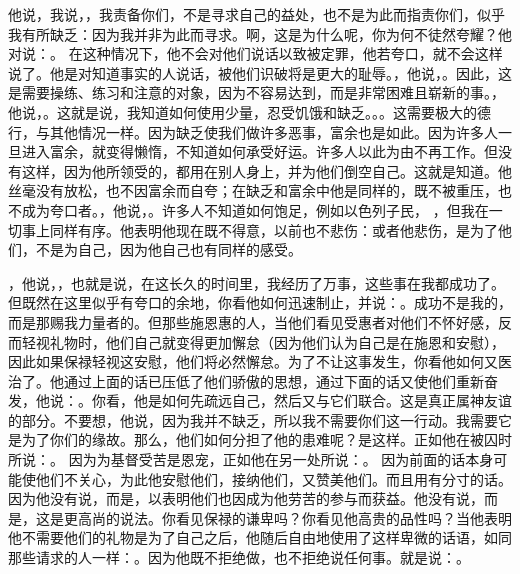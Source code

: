  他说，我说，，我责备你们，不是寻求自己的益处，也不是为此而指责你们，似乎我有所缺乏：因为我并非为此而寻求。啊，这是为什么呢，你为何不徒然夸耀？他对说：。 在这种情况下，他不会对他们说话以致被定罪，他若夸口，就不会这样说了。他是对知道事实的人说话，被他们识破将是更大的耻辱。，他说，。因此，这是需要操练、练习和注意的对象，因为不容易达到，而是非常困难且崭新的事。，他说，。这就是说，我知道如何使用少量，忍受饥饿和缺乏。。。这需要极大的德行，与其他情况一样。因为缺乏使我们做许多恶事，富余也是如此。因为许多人一旦进入富余，就变得懒惰，不知道如何承受好运。许多人以此为由不再工作。但没有这样，因为他所领受的，都用在别人身上，并为他们倒空自己。这就是知道。他丝毫没有放松，也不因富余而自夸；在缺乏和富余中他是同样的，既不被重压，也不成为夸口者。，他说，。许多人不知道如何饱足，例如以色列子民， ，但我在一切事上同样有序。他表明他现在既不得意，以前也不悲伤：或者他悲伤，是为了他们，不是为自己，因为他自己也有同样的感受。\par

，他说，，也就是说，在这长久的时间里，我经历了万事，这些事在我都成功了。但既然在这里似乎有夸口的余地，你看他如何迅速制止，并说：。成功不是我的，而是那赐我力量者的。但那些施恩惠的人，当他们看见受惠者对他们不怀好感，反而轻视礼物时，他们自己就变得更加懈怠（因为他们认为自己是在施恩和安慰），因此如果保禄轻视这安慰，他们将必然懈怠。为了不让这事发生，你看他如何又医治了。他通过上面的话已压低了他们骄傲的思想，通过下面的话又使他们重新奋发，他说：。你看，他是如何先疏远自己，然后又与它们联合。这是真正属神友谊的部分。不要想，他说，因为我并不缺乏，所以我不需要你们这一行动。我需要它是为了你们的缘故。那么，他们如何分担了他的患难呢？是这样。正如他在被囚时所说：。 因为为基督受苦是恩宠，正如他在另一处所说：。 因为前面的话本身可能使他们不关心，为此他安慰他们，接纳他们，又赞美他们。而且用有分寸的话。因为他没有说，而是，以表明他们也因成为他劳苦的参与而获益。他没有说，而是，这是更高尚的说法。你看见保禄的谦卑吗？你看见他高贵的品性吗？当他表明他不需要他们的礼物是为了自己之后，他随后自由地使用了这样卑微的话语，如同那些请求的人一样：。因为他既不拒绝做，也不拒绝说任何事。就是说：。\par

